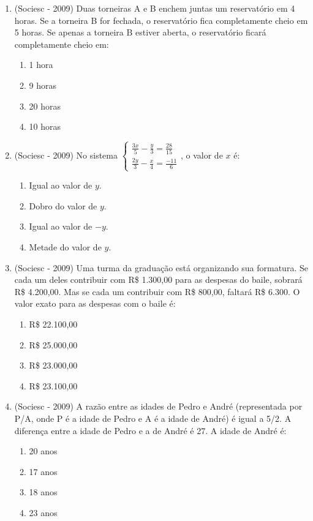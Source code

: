 \begin{enumerate}
\item (Sociesc - 2009) Duas torneiras A e B enchem juntas um reservatório em 4 horas. Se a torneira B for fechada, o reservatório fica completamente cheio em 5 horas. Se apenas a torneira B estiver aberta, o reservatório ficará completamente cheio em:
  \begin{enumerate}
  \item 1 hora
  \item 9 horas
  \item 20 horas
  \item 10 horas
 \end{enumerate}

 \item (Sociesc - 2009) No sistema
 $\begin{cases}
  \frac{3x}{5} - \frac{y}{3} = \frac{28}{15} \\
  \frac{2y}{3} - \frac{x}{4} = \frac{-11}{6}
 \end{cases}$, o valor de $x$ é:
  \begin{enumerate}
  \item Igual ao valor de $y$.
  \item Dobro do valor de $y$.
  \item Igual ao valor de $-y$.
  \item Metade do valor de $y$.
 \end{enumerate}

 \item (Sociesc - 2009) Uma turma da graduação está organizando sua formatura. Se cada um deles contribuir com R\$ 1.300,00 para as despesas do baile, sobrará R\$ 4.200,00. Mas se cada um contribuir com R\$ 800,00, faltará R\$ 6.300. O valor exato para as despesas com o baile é:
  \begin{enumerate}
  \item R\$ 22.100,00
  \item R\$ 25.000,00
  \item R\$ 23.000,00
  \item R\$ 23.100,00
 \end{enumerate}

 \item (Sociesc - 2009) A razão entre as idades de Pedro e André (representada por P/A, onde P é a idade de Pedro e A é a idade de André) é igual a 5/2. A diferença entre a idade de Pedro e a de André é 27. A idade de André é:
 \begin{enumerate}
  \item 20 anos
  \item 17 anos
  \item 18 anos
  \item 23 anos
 \end{enumerate}


\end{enumerate}
